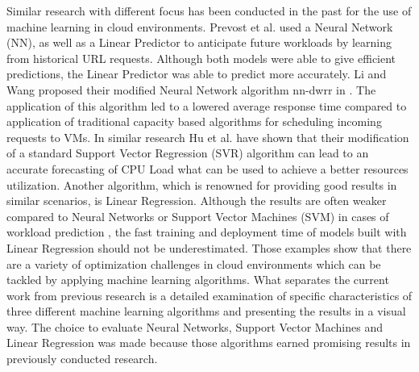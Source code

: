 Similar research with different focus has been conducted in the past for the use of machine learning in cloud environments. Prevost et al. used a Neural Network (NN), as well as a Linear Predictor \cite{prevost2011prediction} to anticipate future workloads by learning from historical URL requests. Although both models were able to give efficient predictions, the Linear Predictor was able to predict more accurately. Li and Wang proposed their modified Neural Network algorithm nn-dwrr in \cite{li2014sla}. The application of this algorithm led to a lowered average response time compared to application of traditional capacity based algorithms for scheduling incoming requests to VMs. In similar research Hu et al. \cite{hu2013kswsvr} have shown that their modification of a standard Support Vector Regression (SVR) algorithm can lead to an accurate forecasting of CPU Load what can be used to achieve a better resources utilization. Another algorithm, which is renowned for providing good results in similar scenarios, is Linear Regression. Although the results are often weaker compared to Neural Networks or Support Vector Machines (SVM) in cases of workload prediction \cite{bankole2013predicting} \cite{imam2011neural}, the fast training and deployment time of models built with Linear Regression should not be underestimated. Those examples show that there are a variety of optimization challenges in cloud environments which can be tackled by applying machine learning algorithms. What separates the current work from previous research is a detailed examination of specific characteristics of three different machine learning algorithms and presenting the results in a visual way. The choice to evaluate Neural Networks, Support Vector Machines and Linear Regression was made because those algorithms earned promising results in previously conducted research.


